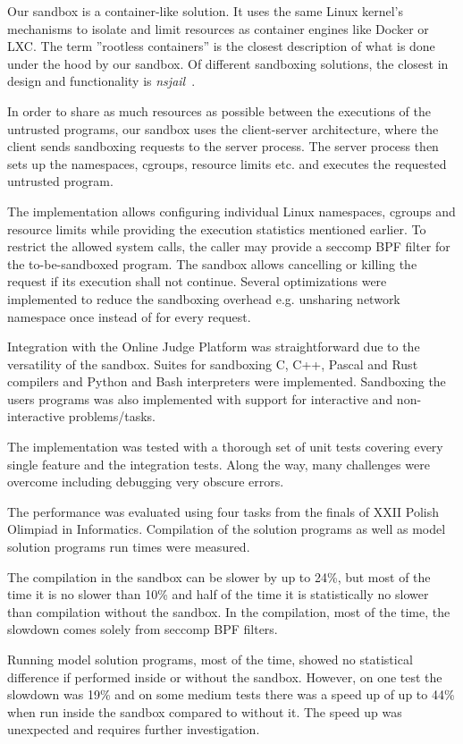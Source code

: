 \documentclass[en]{pracamgr}
\begin{document}
Our sandbox is a container-like solution. It uses the same Linux kernel's mechanisms to isolate and limit resources as container engines like Docker or LXC. The term ''rootless containers'' is the closest description of what is done under the hood by our sandbox. Of different sandboxing solutions, the closest in design and functionality is \textit{nsjail}~\cite{google/nsjail}.

In order to share as much resources as possible between the executions of the untrusted programs, our sandbox uses the client-server architecture, where the client sends sandboxing requests to the server process. The server process then sets up the namespaces, cgroups, resource limits etc. and executes the requested untrusted program.

The implementation allows configuring individual Linux namespaces, cgroups and resource limits while providing the execution statistics mentioned earlier. To restrict the allowed system calls, the caller may provide a seccomp BPF filter for the to-be-sandboxed program. The sandbox allows cancelling or killing the request if its execution shall not continue. Several optimizations were implemented to reduce the sandboxing overhead e.g. unsharing network namespace once instead of for every request.

Integration with the Online Judge Platform was straightforward due to the versatility of the sandbox. Suites for sandboxing C, C++, Pascal and Rust compilers and Python and Bash interpreters were implemented. Sandboxing the users programs was also implemented with support for interactive and non-interactive problems/tasks.

The implementation was tested with a thorough set of unit tests covering every single feature and the integration tests. Along the way, many challenges were overcome including debugging very obscure errors.

The performance was evaluated using four tasks from the finals of XXII Polish Olimpiad in Informatics. Compilation of the solution programs as well as model solution programs run times were measured.

The compilation in the sandbox can be slower by up to 24\%, but most of the time it is no slower than 10\% and half of the time it is statistically no slower than
compilation without the sandbox. In the compilation, most of the time, the slowdown comes solely from seccomp BPF filters.

Running model solution programs, most of the time, showed no statistical difference if performed inside or without the sandbox. However, on one test the slowdown was 19\% and on some medium tests there was a speed up of up to 44\% when run inside the sandbox compared to without it. The speed up was unexpected and requires further investigation.
\end{document}

